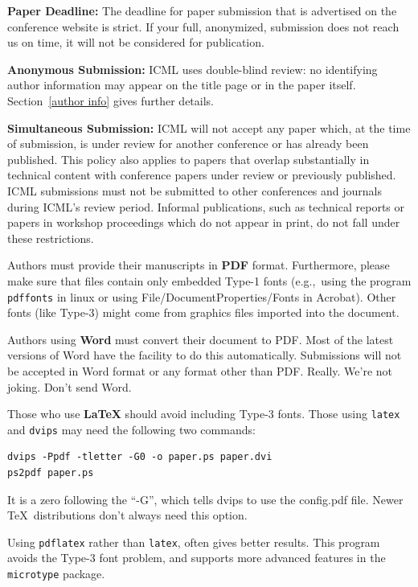 \textbf{Paper Deadline:} The deadline for paper submission that is
advertised on the conference website is strict. If your full,
anonymized, submission does not reach us on time, it will not be
considered for publication. 

\textbf{Anonymous Submission:} ICML uses double-blind review: no identifying
author information may appear on the title page or in the paper
itself. Section~\ref{author info} gives further details.

\textbf{Simultaneous Submission:} ICML will not accept any paper which,
at the time of submission, is under review for another conference or
has already been published. This policy also applies to papers that
overlap substantially in technical content with conference papers
under review or previously published. ICML submissions must not be
submitted to other conferences and journals during ICML's review
period.
Informal publications, such as technical
reports or papers in workshop proceedings which do not appear in
print, do not fall under these restrictions.

\medskip

Authors must provide their manuscripts in \textbf{PDF} format.
Furthermore, please make sure that files contain only embedded Type-1 fonts
(e.g.,~using the program \texttt{pdffonts} in linux or using
File/DocumentProperties/Fonts in Acrobat). Other fonts (like Type-3)
might come from graphics files imported into the document.

Authors using \textbf{Word} must convert their document to PDF\@. Most
of the latest versions of Word have the facility to do this
automatically. Submissions will not be accepted in Word format or any
format other than PDF\@. Really. We're not joking. Don't send Word.

Those who use \textbf{\LaTeX} should avoid including Type-3 fonts.
Those using \texttt{latex} and \texttt{dvips} may need the following
two commands:

{\footnotesize
\begin{verbatim}
dvips -Ppdf -tletter -G0 -o paper.ps paper.dvi
ps2pdf paper.ps
\end{verbatim}}
It is a zero following the ``-G'', which tells dvips to use
the config.pdf file. Newer \TeX\ distributions don't always need this
option.

Using \texttt{pdflatex} rather than \texttt{latex}, often gives better
results. This program avoids the Type-3 font problem, and supports more
advanced features in the \texttt{microtype} package.

